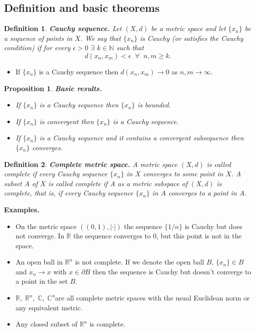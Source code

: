 \documentclass[two column]{article}
\newtheorem{proposition}[theorem]{Proposition}
\newtheorem{definition}{Definition}[subsection]
\begin{document}
\subsection{Definition and basic theorems}

\begin{definition}
{\bf Cauchy sequence.} Let $(X,d)$ be a metric space and let $\{x_{n}\}$ be a sequence of points in $X$. We say that $\{x_{n}\}$ is \emph{Cauchy} (or satisfies the \emph{Cauchy condition}) if for every $\epsilon > 0$ $\exists$ $k \in \mathbb{N}$ such that \vspace{-6pt} 
\[ d(x_{n}, x_{m}) < \epsilon \;\; \forall \;\; n,m \geq k. \]
\end{definition}
\begin{itemize}
\item If $\{x_{n}\}$ is a Cauchy sequence then $d(x_{n}, x_{m}) \rightarrow 0$ as $n,m \rightarrow \infty$. \\ 
\end{itemize}

\begin{proposition} 
{\bf Basic results.}
\begin{itemize}
\item If $\{x_{n}\}$ is a Cauchy sequence then $\{x_{n}\}$ is bounded. 
\item If $\{x_{n}\}$ is convergent then $\{x_{n}\}$ is a Cauchy sequence.
\item If $\{x_{n}\}$ is a Cauchy sequence and it contains a convergent subsequence then $\{x_{n}\}$ converges. \\
\end{itemize}
\end{proposition}

\begin{definition}
{\bf Complete metric space.} A metric space $(X,d)$ is called \emph{complete} if every Cauchy sequence $\{x_{n}\}$ in $X$ converges to some point in $X$. A subset $A$ of $X$ is called complete if A as a metric subspace of $(X,d)$ is complete, that is, if every Cauchy sequence $\{x_{n}\}$ in $A$ converges to a point in $A$. \vspace{6pt}
\end{definition}

{\bf Examples.}
\begin{itemize}
\item On the metric space $((0,1),\lvert \cdot \rvert)$ the sequence $\{ 1/n \}$ is Cauchy but does not converge. In $\mathbb{R}$ the sequence converges to $0$, but this point is not in the space. 
\item An open ball in $\mathbb{R}^{n}$ is not complete. If we denote the open ball $B$, $\{x_n\} \in B$ and $x_{n} \rightarrow x$ with $x \in \partial B$ then the sequence is Cauchy but doesn't converge to a point in the set $B$. 
\item $\mathbb{R}, \; \mathbb{R}^{n}, \; \mathbb{C}, \; \mathbb{C}^{n}$are all complete metric spaces with the usual Euclidean norm or any equivalent metric. 
\item Any closed subset of $\mathbb{R}^{n}$ is complete. \vspace{6pt}
\end{itemize}
\end{document}
